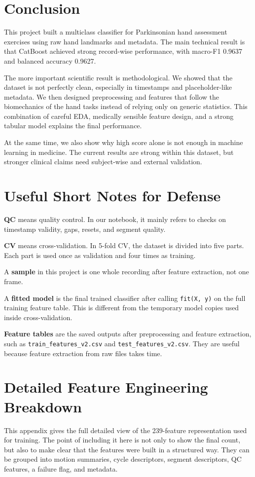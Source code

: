 \documentclass[10pt,twocolumn]{article}
\begin{document}
\section{Conclusion}
This project built a multiclass classifier for Parkinsonian hand assessment exercises using raw hand landmarks and metadata. The main technical result is that CatBoost achieved strong record-wise performance, with macro-F1 0.9637 and balanced accuracy 0.9627.

The more important scientific result is methodological. We showed that the dataset is not perfectly clean, especially in timestamps and placeholder-like metadata. We then designed preprocessing and features that follow the biomechanics of the hand tasks instead of relying only on generic statistics. This combination of careful EDA, medically sensible feature design, and a strong tabular model explains the final performance.

At the same time, we also show why high score alone is not enough in machine learning in medicine. The current results are strong within this dataset, but stronger clinical claims need subject-wise and external validation.

\appendix

\section{Useful Short Notes for Defense}
\textbf{QC} means quality control. In our notebook, it mainly refers to checks on timestamp validity, gaps, resets, and segment quality.

\textbf{CV} means cross-validation. In 5-fold CV, the dataset is divided into five parts. Each part is used once as validation and four times as training.

A \textbf{sample} in this project is one whole recording after feature extraction, not one frame.

A \textbf{fitted model} is the final trained classifier after calling \texttt{fit(X, y)} on the full training feature table. This is different from the temporary model copies used inside cross-validation.

\textbf{Feature tables} are the saved outputs after preprocessing and feature extraction, such as \texttt{train\_features\_v2.csv} and \texttt{test\_features\_v2.csv}. They are useful because feature extraction from raw files takes time.

\section{Detailed Feature Engineering Breakdown}
This appendix gives the full detailed view of the 239-feature representation used for training. The point of including it here is not only to show the final count, but also to make clear that the features were built in a structured way. They can be grouped into motion summaries, cycle descriptors, segment descriptors, QC features, a failure flag, and metadata.
\end{document}
